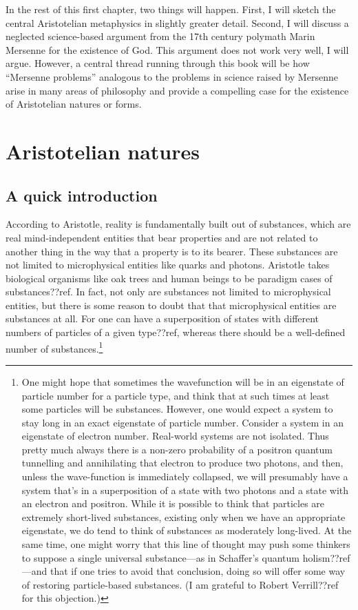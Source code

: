 In the rest of this first chapter, two things will happen. First, I will sketch the central Aristotelian metaphysics in slightly
greater detail. Second, I will discuss a neglected science-based argument from the 17th century polymath Marin Mersenne for the existence 
of God. This argument does not work very well, I will argue. However, a central thread running through this book will be how ``Mersenne 
problems'' analogous to the problems in science raised by Mersenne arise in many areas of philosophy and provide a compelling 
case for the existence of Aristotelian natures or forms.

\section{Aristotelian natures}
\subsection{A quick introduction}
According to Aristotle, reality is fundamentally built out of substances, which are real mind-independent entities that
bear properties and are not related to another thing in the way that a property is to its bearer.
These substances are not limited to microphysical entities like quarks and photons. Aristotle takes biological organisms 
like oak trees and human beings to be paradigm cases of substances??ref. In fact, not only are substances not limited to 
microphysical entities, but there is some reason to doubt that that microphysical entities are substances at all. For 
one can have a superposition of states with different numbers of particles of a given type??ref, whereas there should be a well-defined 
number of substances.\footnote{One might hope that sometimes the wavefunction will be in an eigenstate of particle
number for a particle type, and think that at such times at least some particles will be substances. However, one would expect a system
to stay long in an exact eigenstate of particle number. Consider a system in an eigenstate of electron number. Real-world
systems are not isolated. Thus pretty much always there is a non-zero probability of a positron quantum tunnelling and annihilating
that electron to produce two photons, and then, unless the wave-function is immediately collapsed, we will presumably have 
a system that's in a superposition of a state with two photons and a state with an electron and positron. While it is possible
to think that particles are extremely short-lived substances, existing only when we have an appropriate eigenstate, we do tend
to think of substances as moderately long-lived. At the same time, one might worry that this line of thought may push some 
thinkers to suppose a single universal substance---as in Schaffer's quantum holism??ref---and that if one tries to avoid
that conclusion, doing so will offer some way of restoring particle-based substances. (I am grateful to Robert Verrill??ref for
this objection.)}

